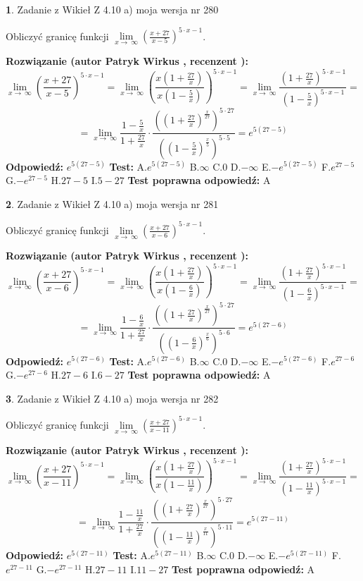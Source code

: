 \documentclass[12pt, a4paper]{article}
\theoremstyle{definition} %
\newtheorem{zad}{}
\newcommand{\zadStart}[1]{\begin{zad}#1\newline}
\newcommand{\zadStop}{\end{zad}}
\newcommand{\rozwStart}[2]{\noindent \textbf{Rozwiązanie (autor #1 , recenzent #2): }\newline}
\newcommand{\rozwStop}{\newline}
\newcommand{\odpStart}{\noindent \textbf{Odpowiedź:}\newline}
\newcommand{\odpStop}{\newline}
\newcommand{\testStart}{\noindent \textbf{Test:}\newline}
\newcommand{\testStop}{\newline}
\newcommand{\kluczStart}{\noindent \textbf{Test poprawna odpowiedź:}\newline}
\newcommand{\kluczStop}{\newline}
\begin{document}
\zadStart{Zadanie z Wikieł Z 4.10 a) moja wersja nr 280}


Obliczyć granicę funkcji  $\lim\limits_{x\to\ \infty}(\frac{x+27}{x-5})^{5\cdot x-1}$.
\zadStop
\rozwStart{Patryk Wirkus}{}
$$\lim\limits_{x\to\ \infty}(\frac{x+27}{x-5})^{5\cdot x-1} = \lim\limits_{x\to\ \infty}(\frac{x(1+\frac{27}{x})}{x(1-\frac{5}{x})})^{5\cdot x-1}=\lim\limits_{x\to\ \infty}\frac{(1+\frac{27}{x})^{5\cdot x-1}}{(1-\frac{5}{x})^{5\cdot x-1}}=$$
$$=\lim\limits_{x\to\ \infty}\frac{1-\frac{5}{x}}{1+\frac{27}{x}}\cdot\frac{((1+\frac{27}{x})^{\frac{x}{27}})^{5\cdot27}}{((1-\frac{5}{x})^{\frac{x}{5}})^{5\cdot5}}=e^{5(27-5)}$$
\rozwStop
\odpStart
$e^{5(27-5)}$
\odpStop
\testStart
A.$e^{5(27-5)}$ B.$\infty$ C.$0$ D.$-\infty$ E.$-e^{5(27-5)}$
F.$e^{27-5}$ G.$-e^{27-5}$
H.$27-5$
I.$5-27$
\testStop
\kluczStart
A
\kluczStop



\zadStart{Zadanie z Wikieł Z 4.10 a) moja wersja nr 281}


Obliczyć granicę funkcji  $\lim\limits_{x\to\ \infty}(\frac{x+27}{x-6})^{5\cdot x-1}$.
\zadStop
\rozwStart{Patryk Wirkus}{}
$$\lim\limits_{x\to\ \infty}(\frac{x+27}{x-6})^{5\cdot x-1} = \lim\limits_{x\to\ \infty}(\frac{x(1+\frac{27}{x})}{x(1-\frac{6}{x})})^{5\cdot x-1}=\lim\limits_{x\to\ \infty}\frac{(1+\frac{27}{x})^{5\cdot x-1}}{(1-\frac{6}{x})^{5\cdot x-1}}=$$
$$=\lim\limits_{x\to\ \infty}\frac{1-\frac{6}{x}}{1+\frac{27}{x}}\cdot\frac{((1+\frac{27}{x})^{\frac{x}{27}})^{5\cdot27}}{((1-\frac{6}{x})^{\frac{x}{6}})^{5\cdot6}}=e^{5(27-6)}$$
\rozwStop
\odpStart
$e^{5(27-6)}$
\odpStop
\testStart
A.$e^{5(27-6)}$ B.$\infty$ C.$0$ D.$-\infty$ E.$-e^{5(27-6)}$
F.$e^{27-6}$ G.$-e^{27-6}$
H.$27-6$
I.$6-27$
\testStop
\kluczStart
A
\kluczStop



\zadStart{Zadanie z Wikieł Z 4.10 a) moja wersja nr 282}


Obliczyć granicę funkcji  $\lim\limits_{x\to\ \infty}(\frac{x+27}{x-11})^{5\cdot x-1}$.
\zadStop
\rozwStart{Patryk Wirkus}{}
$$\lim\limits_{x\to\ \infty}(\frac{x+27}{x-11})^{5\cdot x-1} = \lim\limits_{x\to\ \infty}(\frac{x(1+\frac{27}{x})}{x(1-\frac{11}{x})})^{5\cdot x-1}=\lim\limits_{x\to\ \infty}\frac{(1+\frac{27}{x})^{5\cdot x-1}}{(1-\frac{11}{x})^{5\cdot x-1}}=$$
$$=\lim\limits_{x\to\ \infty}\frac{1-\frac{11}{x}}{1+\frac{27}{x}}\cdot\frac{((1+\frac{27}{x})^{\frac{x}{27}})^{5\cdot27}}{((1-\frac{11}{x})^{\frac{x}{11}})^{5\cdot11}}=e^{5(27-11)}$$
\rozwStop
\odpStart
$e^{5(27-11)}$
\odpStop
\testStart
A.$e^{5(27-11)}$ B.$\infty$ C.$0$ D.$-\infty$ E.$-e^{5(27-11)}$
F.$e^{27-11}$ G.$-e^{27-11}$
H.$27-11$
I.$11-27$
\testStop
\kluczStart
A
\kluczStop
\end{document}
